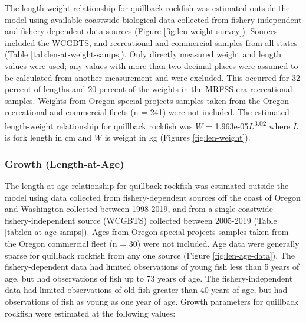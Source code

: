 \documentclass[11pt,
  english,
  letterpaper,
]{article}
\begin{document}
The length-weight relationship for quillback rockfish was estimated outside the model using available coastwide biological data collected from fishery-independent and fishery-dependent data sources (Figure \ref{fig:len-weight-survey}). Sources included the WCGBTS, and recreational and commercial samples from all states (Table \ref{tab:len-at-weight-samps}). Only directly measured weight and length values were used; any values with more than two decimal places were assumed to be calculated from another measurement and were excluded. This occurred for 32 percent of lengths and 20 percent of the weights in the MRFSS-era recreational samples. Weights from Oregon special projects samples taken from the Oregon recreational and commercial fleets (n = 241) were not included. The estimated length-weight relationship for quillback rockfish was {\(W\)\leavevmode\tagmcend\tagstructend} = 1.963e-05{\(L\)\leavevmode\tagmcend\tagstructend}\textsuperscript{3.02} where {\(L\)\leavevmode\tagmcend\tagstructend} is fork length in cm and {\(W\)\leavevmode\tagmcend\tagstructend} is weight in kg (Figures \ref{fig:len-weight}).

\leavevmode\tagmcend\tagstructend\par


\hypertarget{growth-length-at-age}{%
\subsubsection{Growth (Length-at-Age)}\label{growth-length-at-age}}

\leavevmode\tagmcend\tagstructend


The length-at-age relationship for quillback rockfish was estimated outside the model using data collected from fishery-dependent sources off the coast of Oregon and Washington collected between 1998-2019, and from a single coastwide fishery-independent source (WCGBTS) collected between 2005-2019 (Table \ref{tab:len-at-age-samps}). Ages from Oregon special projects samples taken from the Oregon commercial fleet (n = 30) were not included. Age data were generally sparse for quillback rockfish from any one source (Figure \ref{fig:len-age-data}). The fishery-dependent data had limited observations of young fish less than 5 years of age, but had observations of fish up to 73 years of age. The fishery-independent data had limited observations of old fish greater than 40 years of age, but had observations of fish as young as one year of age. Growth parameters for quillback rockfish were estimated at the following values:
\end{document}
